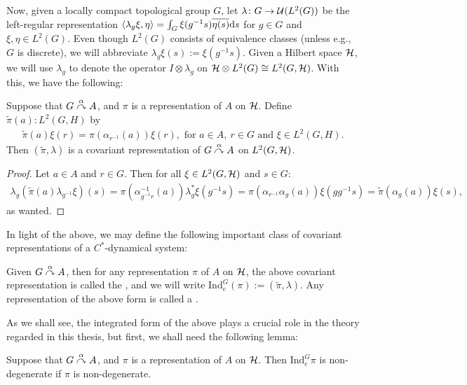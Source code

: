 Now, given a locally compact topological group $G$, let $\lambda \colon G \to \mathcal{U}(L^2(G))$ be the left-regular representation $\langle \lambda_g \xi, \eta\rangle = \int_G \xi(g^{-1}s)\overline{\eta(s)}\mathrm{d} s$ for $g \in G$ and $\xi, \eta \in L^2(G)$. Even though $L^2(G)$ consists of equivalence classes (unless e.g., $G$ is discrete), we will abbreviate $\lambda_g \xi(s) := \xi(g^{-1}s)$. Given a Hilbert space $\mathcal{H}$, we will use $\lambda_g$ to denote the operator $I \otimes \lambda_g$ on $\mathcal{H} \otimes L^2(G) \cong L^2(G,\mathcal{H})$. With this, we have the following:
\begin{lemma}
	Suppose that $G \stackrel{\alpha}{\curvearrowright} A$, and $\pi$ is a representation of $A$ on $\mathcal{H}$. Define $\tilde{\pi}(a) \colon L^2(G,H)$ by 
	\begin{align*}
		\tilde{\pi}(a)\xi(r) = \pi(\alpha_{r^{-1}}(a))\xi(r), \text{ for } a \in A, \ r \in G \text{ and } \xi \in L^2(G,H).
	\end{align*}
	Then $(\tilde{\pi},\lambda)$ is a covariant representation of $G \stackrel{\alpha}{\curvearrowright} A$ on $L^2(G,\mathcal{H})$.
	\label{cross:regularrep}
\end{lemma}
\begin{proof}
	Let $a \in A$ and $r \in G$. Then for all $\xi \in L^2(G,\mathcal{H})$ and $s \in G$:
	\begin{align*}
		\lambda_g (\tilde{\pi}(a) \lambda_{g^{-1}} \xi)(s) = \pi(\alpha_{g^{-1}r}^{-1}(a))\lambda_g^* \xi(g^{-1}s) = \pi(\alpha_{r^{-1}}\alpha_g(a))\xi (g g^{-1} s) = \tilde{\pi}(\alpha_g(a))\xi(s),
	\end{align*}
	as wanted.
\end{proof}
In light of the above, we may define the following important class of covariant representations of a $C^*$-dynamical system:
\begin{definition}
	Given $G \stackrel{\alpha}{\curvearrowright} A$, then for any representation $\pi$ of $A$ on $\mathcal{H}$, the above covariant representation is called the , and we will write $\mathrm{Ind}_e^G(\pi) := (\tilde{\pi}, \lambda)$. Any representation of the above form is called a .
\end{definition}
As we shall see, the integrated form of the above plays a crucial role in the theory regarded in this thesis, but first, we shall need the following lemma:
\begin{lemma}
	Suppose that $G \stackrel{\alpha}{\curvearrowright} A$, and $\pi$ is a representation of $A$ on $\mathcal{H}$. Then $\mathrm{Ind}_e^G \pi$ is non-degenerate if $\pi$ is non-degenerate.
	\label{cross:regrepnondeg}
\end{lemma}

